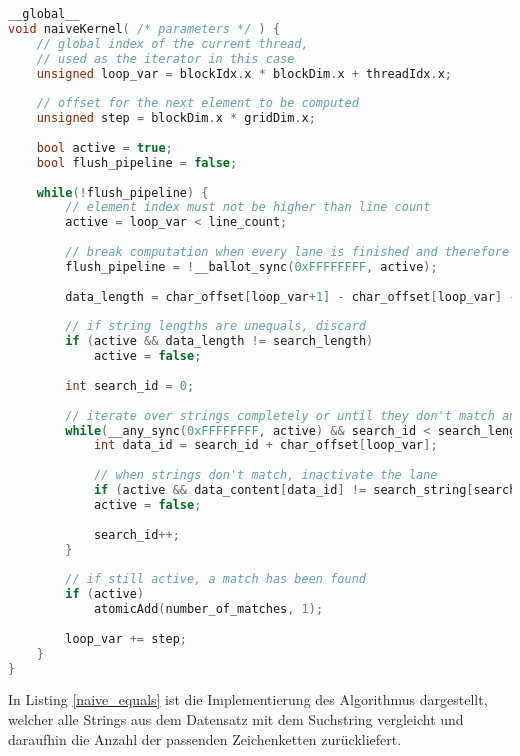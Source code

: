 \begin{lstlisting}[language=C++,
	caption=Naive Implementierung des String-Vergleichs,
	label=naive_equals]
__global__
void naiveKernel( /* parameters */ ) {
	// global index of the current thread,
	// used as the iterator in this case
	unsigned loop_var = blockIdx.x * blockDim.x + threadIdx.x;
	
	// offset for the next element to be computed
	unsigned step = blockDim.x * gridDim.x;
	
	bool active = true;
	bool flush_pipeline = false;
	
	while(!flush_pipeline) {
		// element index must not be higher than line count
		active = loop_var < line_count;
		
		// break computation when every lane is finished and therefore inactive
		flush_pipeline = !__ballot_sync(0xFFFFFFFF, active);
		
		data_length = char_offset[loop_var+1] - char_offset[loop_var] - 1;
		
		// if string lengths are unequals, discard
		if (active && data_length != search_length)
			active = false;
		
		int search_id = 0;
		
		// iterate over strings completely or until they don't match anymore
		while(__any_sync(0xFFFFFFFF, active) && search_id < search_length) {
			int data_id = search_id + char_offset[loop_var];
			
			// when strings don't match, inactivate the lane
			if (active && data_content[data_id] != search_string[search_id])
			active = false;
			
			search_id++;
		}
		
		// if still active, a match has been found
		if (active)
			atomicAdd(number_of_matches, 1);
		
		loop_var += step;
	}
}
\end{lstlisting}

In Listing \ref{naive_equals} ist die Implementierung des Algorithmus dargestellt, welcher alle Strings aus dem Datensatz mit dem Suchstring vergleicht und daraufhin die Anzahl der passenden Zeichenketten zurückliefert.


